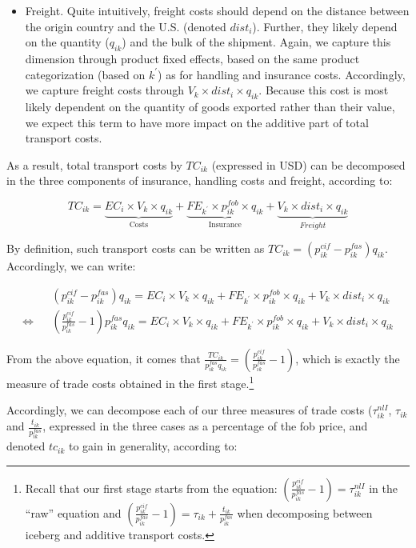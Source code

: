 \documentclass[a4paper,11pt]{article}
\begin{document}
\begin{itemize}
\item Freight. Quite intuitively, freight costs should depend on the distance between the origin country and the U.S. (denoted $dist_i$). Further, they likely depend on the quantity ($q_{ik}$) and the bulk of the shipment. Again, we capture this dimension through product fixed effects, based on the same product categorization (based on $k^\prime$) as for handling and insurance costs. Accordingly, we capture freight costs through $V_{k}\times dist_i\times q_{ik}$. Because this cost is most likely dependent on the quantity of goods exported rather than their value, we expect this term to have more impact on the additive part of total transport costs.


\end{itemize}

As a result, total transport costs by $TC_{ik}$ (expressed in USD) can be decomposed in the three components of insurance, handling costs and freight, according to:

$$TC_{ik} =  \underbrace{EC_i\times V_{k}\times q_{ik}}_{\text{Costs}} +\underbrace{FE_{k^\prime}\times p_{ik}^{fob}\times q_{ik}}_{\text{Insurance}}+ \underbrace{V_k\times dist_i\times q_{ik}}_{Freight}$$

By definition, such transport costs can be written as $TC_{ik} = (p^{cif}_{ik} - p^{fas}_{ik})q_{ik}$. Accordingly, we can write:

\begin{eqnarray*}
&&(p^{cif}_{ik} - p^{fas}_{ik})q_{ik} = EC_i\times V_{k}\times q_{ik}+ FE_{k^\prime}\times p_{ik}^{fob}\times q_{ik}+ V_{k}\times dist_i\times q_{ik} \\
\Leftrightarrow && \left(\frac{p^{cif}_{ik}}{p^{fas}_{ik}} -1 \right)p^{fas}_{ik} q_{ik} = EC_i\times V_{k}\times q_{ik}+ FE_{k^\prime}\times p_{ik}^{fob}\times q_{ik}+ V_k \times dist_i\times q_{ik}
\end{eqnarray*}

From the above equation, it comes that $\frac{TC_{ik}}{p^{fas}_{ik} q_{ik}} = \left(\frac{p^{cif}_{ik}}{p^{fas}_{ik}} -1 \right)$, which is exactly the measure of trade costs obtained in the first stage.\footnote{Recall that our first stage starts from the equation: $\left(\frac{p^{cif}_{ik}}{p^{fas}_{ik}} -1 \right) = \tau^{nlI}_{ik}$ in the ``raw'' equation and $\left(\frac{p^{cif}_{ik}}{p^{fas}_{ik}} -1 \right) = \tau_{ik}+ \frac{t_{ik}}{p^{fas}_{ik}}$ when decomposing between iceberg and additive transport costs.}

Accordingly, we can decompose each of our three measures of trade costs ($\tau^{nlI}_{ik}$, $\tau_{ik}$ and $\frac{t_{ik}}{p^{fas}_{ik}}$, expressed in the three cases as a percentage of the fob price, and denoted $tc_{ik}$ to gain in generality, according to:
\end{document}
